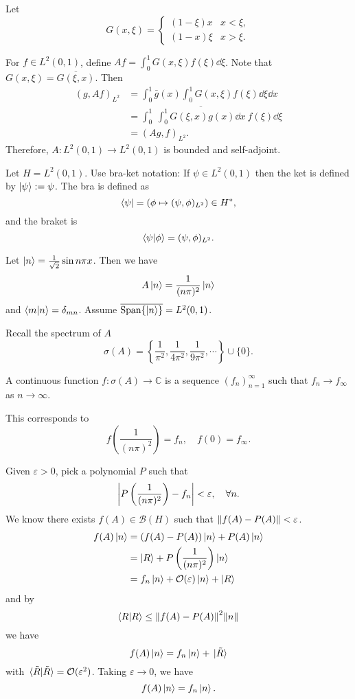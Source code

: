 \documentclass[a4paper,11pt]{article}
\begin{document}
	\begin{ex}
		Let 
		\[
			G(x,\xi) = \begin{cases}
				(1 - \xi) x & x < \xi,\\
				(1 - x) \xi & x > \xi.
			\end{cases}
		\]

		For $f \in L^2(0,1)$, define $Af = \int_{0}^{1} G(x, \xi) f(\xi) \dd{\xi}$. Note that $G(x,\xi) = \overline{G(\xi,x)}$. Then
		\begin{align*}
			(g, Af)_{L^2} & = \int_{0}^{1} \bar g(x) \int_{0}^{1} G(x,\xi) f(\xi) \dd{\xi} \dd{x}\\
			& = \int_{0}^{1}\ \overline{\int_{0}^{1} G(\xi, x) g(x) \dd{x}}\ f(\xi) \dd{\xi}\\
			& = (Ag, f) _{L^2}.
		\end{align*}
		Therefore, $A : L^2(0,1) \to L^2(0,1)$ is bounded and self-adjoint. 
	\end{ex}

	Let $H = L^2(0,1)$. Use bra-ket notation: If $\psi \in L^2(0,1)$ then the ket is defined by $\ket{\psi} := \psi$. The bra is defined as 
	\[
		\bra{\psi} = \left( \phi \mapsto (\psi,\phi)_{L^2} \right) \in H^*,
	\]
	and the braket is 
	\[
		\braket{\psi}{\phi} = (\psi, \phi)_{L^2}.
	\]

	Let $\ket{n} = \frac{1}{\sqrt{2}} \sin n\pi x$. Then we have 
	\[
		A \ket{n} = \frac{1}{(n \pi)^2} \ket{n}
	\]
	and $\braket{m}{n} = \delta _{mn}$. Assume $\overline{\operatorname{Span} \{\ket{n}\}} = L^2(0,1)$. 
	
	Recall the spectrum of $A$ 
	\[
		\sigma(A) = \left\{ \frac{1}{\pi^2}, \frac{1}{4 \pi^2}, \frac{1}{9 \pi^2}, \cdots  \right\} \cup \{0\}.
	\]

	A continuous function $f : \sigma(A) \to \mathbb{C}$ is a sequence $(f_n)_{n=1}^{\infty}$ such that $f_n \to f_\infty$ as $n \to \infty$.

	This corresponds to 
	\[
		f\left( \frac{1}{(n \pi)^2} \right) = f_n, \quad f(0) = f _{\infty}.
	\]

	Given $\varepsilon > 0$, pick a polynomial $P$ such that 
	\[
		\abs{P \left( \frac{1}{(n \pi)^2} \right) - f_n} < \varepsilon, \quad \forall n.
	\]
	We know there exists $f(A) \in \mathcal{B}(H)$ such that $\norm{f(A) - P(A)} < \varepsilon$.
	\begin{align*}
		f(A) \ket{n} & = (f(A) - P(A)) \ket{n} + P(A) \ket{n}\\
		& = \ket{R} + P \left( \frac{1}{(n \pi)^2} \right) \ket{n}\\
		& = f_n \ket{n} + \mathcal{O}(\varepsilon) \ket{n} + \ket{R}
	\end{align*}
	and by 
	\[
		\braket{R}{R} \leq \norm{f(A) - P(A)}^2 \norm{n}
	\]
	we have 
	\[
		f(A) \ket{n} = f_n \ket{n} + \ket*{\tilde R}
	\]
	with $\braket*{\tilde R}{\tilde R} = \mathcal{O}(\varepsilon^2)$. Taking $\varepsilon \to 0$, we have 
	\[
		f(A) \ket{n} = f_n \ket{n}.
	\]
\end{document}

